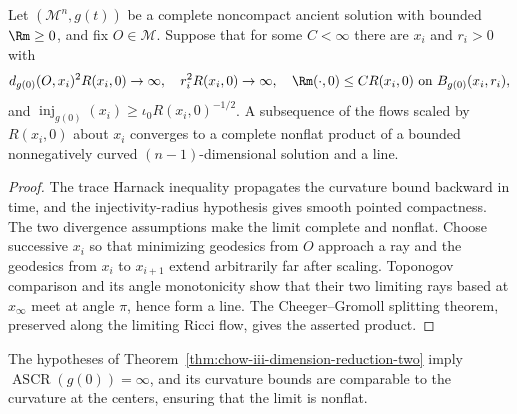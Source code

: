 \begin{theorem}
\label{thm:chow-iii-dimension-reduction-two}
Let \((\mathcal M^n,g(t))\) be a complete noncompact ancient solution with
bounded \(\Rm\ge0\), and fix \(O\in\mathcal M\).  Suppose that for some
\(C<\infty\) there are \(x_i\) and \(r_i>0\) with
\[
 d_{g(0)}(O,x_i)^2R(x_i,0)\to\infty,
 \quad r_i^2R(x_i,0)\to\infty,
 \quad \Rm(\cdot,0)\le CR(x_i,0)\ \text{on }B_{g(0)}(x_i,r_i),
\]
and \(\operatorname{inj}_{g(0)}(x_i)\ge\iota_0R(x_i,0)^{-1/2}\).  A
subsequence of the flows scaled by \(R(x_i,0)\) about \(x_i\) converges to a
complete nonflat product of a bounded nonnegatively curved
\((n-1)\)-dimensional solution and a line.
\end{theorem}
\begin{proof}
\sketch The trace Harnack inequality propagates the curvature bound backward in time,
and the injectivity-radius hypothesis gives smooth pointed compactness.  The
two divergence assumptions make the limit complete and nonflat.  Choose
successive \(x_i\) so that minimizing geodesics from \(O\) approach a ray and
the geodesics from \(x_i\) to \(x_{i+1}\) extend arbitrarily far after scaling.
Toponogov comparison and its angle monotonicity show that their two limiting
rays based at \(x_\infty\) meet at angle \(\pi\), hence form a line.  The
Cheeger--Gromoll splitting theorem, preserved along the limiting Ricci flow,
gives the asserted product.
\end{proof}

\begin{remark}
\label{rem:chow-iii-dimension-reduction-infinite-ascr}
The hypotheses of Theorem~\ref{thm:chow-iii-dimension-reduction-two} imply
\(\operatorname{ASCR}(g(0))=\infty\), and its curvature bounds are comparable
to the curvature at the centers, ensuring that the limit is nonflat.
\end{remark}

